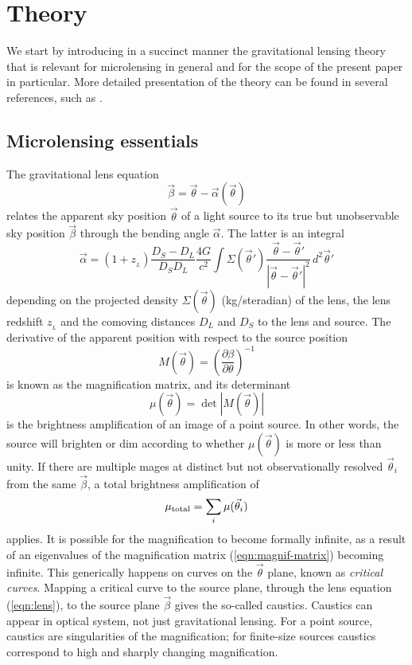 
\section{Theory}

We start by introducing in a succinct manner the gravitational lensing
theory that is relevant for microlensing in general and for the scope
of the present paper in particular.  More detailed presentation of the
theory can be found in several references, such as
\cite{2001stgl.book.....P}.

\subsection{Microlensing essentials}

The gravitational lens equation
\begin{equation}
\vec\beta = \vec\theta - \vec\alpha(\vec\theta)
\label{eqn:lens}
\end{equation}
relates the apparent sky position $\vec\theta$ of a light source to
its true but unobservable sky position $\vec\beta$ through the bending
angle $\vec\alpha$.  The latter is an integral 
\begin{equation}
\vec\alpha = (1+z_{_L})\frac{D_S-D_L}{D_SD_L} \frac{4G}{c^2}
\int \Sigma(\vec\theta')
\frac{\vec\theta-\vec\theta'}{|\vec\theta-\vec\theta'|^2}\,
d^2\vec\theta'
\label{eqn:alpha}
\end{equation}
depending on the projected density $\Sigma(\vec\theta)$ (kg/steradian)
of the lens, the lens redshift $z_{_L}$ and the comoving distances
$D_L$ and $D_S$ to the lens and source.  The derivative of the
apparent position with respect to the source position
\begin{equation}
M(\vec\theta) =
\left(\frac{\partial\beta}{\partial\theta}\right)^{-1}
\label{eqn:magnif-matrix}
\end{equation}
is known as the magnification matrix, and its determinant
\begin{equation}
\mu(\vec\theta) = \det|M(\vec\theta)|
\end{equation}
is the brightness amplification of an image of a point source.  In
other words, the source will brighten or dim according to whether
$\mu(\vec\theta)$ is more or less than unity.  If there are multiple
mages at distinct but not observationally resolved $\vec\theta_i$ from
the same $\vec\beta$, a total brightness amplification
of\begin{equation} \mu_{\rm total} = \sum_{i} \mu(\vec\theta_i)
\end{equation}
applies. It is possible for the magnification to become formally
infinite, as a result of an eigenvalues of the magnification matrix
(\ref{eqn:magnif-matrix}) becoming infinite.  This generically happens
on curves on the $\vec\theta$ plane, known as {\em critical curves}.
Mapping a critical curve to the source plane, through the lens
equation (\ref{eqn:lens}), to the source plane $\vec\beta$ gives the
so-called caustics.  Caustics can appear in optical system, not just
gravitational lensing.  For a point source, caustics are singularities
of the magnification; for finite-size sources caustics correspond to
high and sharply changing magnification.

